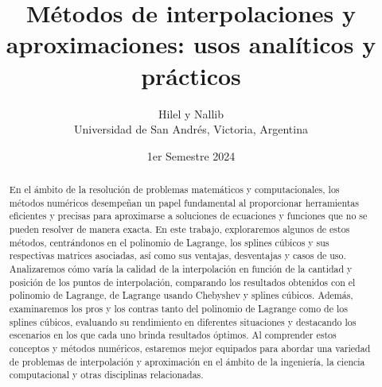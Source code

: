 \documentclass[12pt,a4]{article} %
\title{Métodos de interpolaciones y aproximaciones: \newline usos analíticos y prácticos}
\author{Hilel y Nallib\\ [2mm] %
\small Universidad de San Andrés, Victoria, Argentina}
\date{1er Semestre 2024}
\begin{document}
\maketitle


\begin{abstract}
    En el ámbito de la resolución de problemas matemáticos y computacionales, los métodos numéricos desempeñan un papel fundamental al proporcionar herramientas eficientes y precisas para aproximarse a soluciones de ecuaciones y funciones que no se pueden resolver de manera exacta. En este trabajo, exploraremos algunos de estos métodos, centrándonos en el polinomio de Lagrange, los splines cúbicos y sus respectivas matrices asociadas, así como sus ventajas, desventajas y casos de uso. Analizaremos cómo varía la calidad de la interpolación en función de la cantidad y posición de los puntos de interpolación, comparando los resultados obtenidos con el polinomio de Lagrange, de Lagrange usando Chebyshev y splines cúbicos. Además, examinaremos los pros y los contras tanto del polinomio de Lagrange como de los splines cúbicos, evaluando su rendimiento en diferentes situaciones y destacando los escenarios en los que cada uno brinda resultados óptimos. Al comprender estos conceptos y métodos numéricos, estaremos mejor equipados para abordar una variedad de problemas de interpolación y aproximación en el ámbito de la ingeniería, la ciencia computacional y otras disciplinas relacionadas.
\end{abstract}
\end{document}
